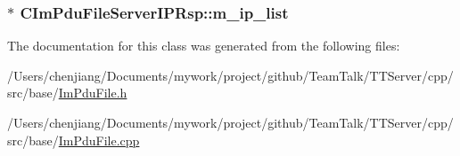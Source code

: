 \subsubsection[{m\+\_\+ip\+\_\+list}]{$\ast$ C\+Im\+Pdu\+File\+Server\+I\+P\+Rsp\+::m\+\_\+ip\+\_\+list\hspace{0.3cm}{\ttfamily [private]}}\label{class_c_im_pdu_file_server_i_p_rsp_a7b1ed032d2932312cd18961690d77181}


The documentation for this class was generated from the following files\+:\begin{DoxyCompactItemize}
\item 
/\+Users/chenjiang/\+Documents/mywork/project/github/\+Team\+Talk/\+T\+T\+Server/cpp/src/base/\hyperlink{_im_pdu_file_8h}{Im\+Pdu\+File.\+h}\item 
/\+Users/chenjiang/\+Documents/mywork/project/github/\+Team\+Talk/\+T\+T\+Server/cpp/src/base/\hyperlink{_im_pdu_file_8cpp}{Im\+Pdu\+File.\+cpp}\end{DoxyCompactItemize}
